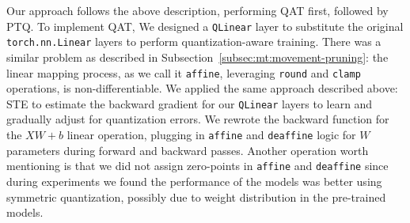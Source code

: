Our approach follows the above description, performing QAT first, followed by PTQ.
To implement QAT, We designed a \texttt{QLinear} layer to substitute the original \texttt{torch.nn.Linear} layers
to perform quantization-aware training.
There was a similar problem as described in Subsection~\ref{subsec:mt:movement-pruning}:
the linear mapping process, as we call it \texttt{affine}, leveraging \texttt{round} and \texttt{clamp} operations,
is non-differentiable.
We applied the same approach described above: STE to estimate the backward gradient for our \texttt{QLinear} layers
to learn and gradually adjust for quantization errors.
We rewrote the backward function for the $XW + b$ linear operation, plugging in \texttt{affine} and \texttt{deaffine} logic
for $W$ parameters during forward and backward passes.
Another operation worth mentioning is that we did not assign zero-points in \texttt{affine} and \texttt{deaffine}
since during experiments we found the performance of the models was better using symmetric quantization,
possibly due to weight distribution in the pre-trained models.
